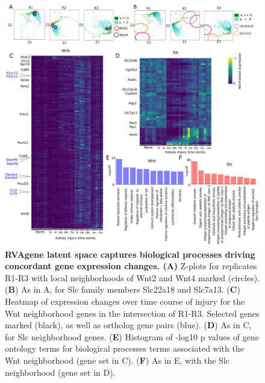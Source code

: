 {\centering
\begin{figure}
  \includegraphics[width = \linewidth]{figures/fig9.png}
    \caption[RVAgene latent space captures biological processes driving concordant gene expression changes.]{{\bf RVAgene latent space captures biological processes driving concordant gene expression changes. (A)} Z-plots for replicates R1-R3 with local neighborhoods of Wnt2 and Wnt4 marked (circles). ({\bf B}) As in A, for Slc family members Slc22a18 and Slc7a13. ({\bf C}) Heatmap of expression changes over time course of injury for the Wnt neighborhood genes in the intersection of R1-R3. Selected genes marked (black), as well as ortholog gene pairs (blue).  ({\bf D}) As in C, for Slc neighborhood genes. ({\bf E}) Histogram of -log10 p values of gene ontology terms for biological processes terms associated with the Wnt neighborhood (gene set in C). ({\bf F}) As in E, with the Slc neighborhood (gene set in D). }
  \label{fig:fig6b}
\end{figure}
}

